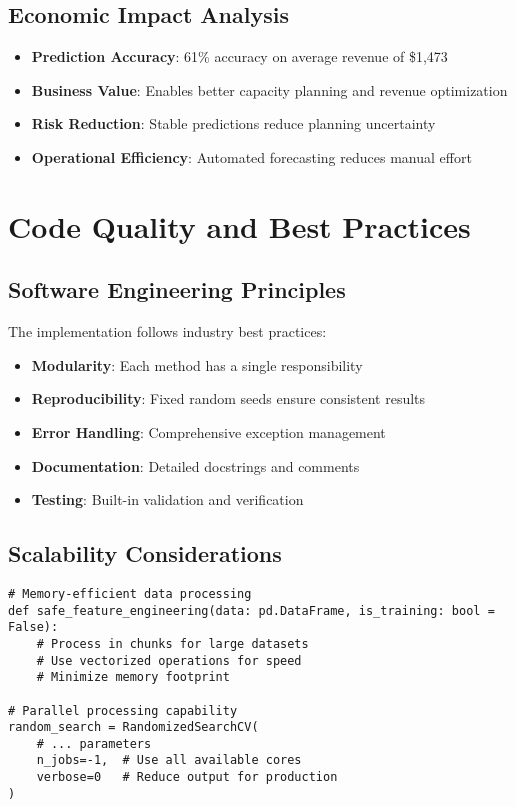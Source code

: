 \documentclass[12pt,a4paper]{article}
\begin{document}
\subsection{Economic Impact Analysis}

\begin{itemize}
    \item \textbf{Prediction Accuracy}: 61\% accuracy on average revenue of \$1,473
    \item \textbf{Business Value}: Enables better capacity planning and revenue optimization
    \item \textbf{Risk Reduction}: Stable predictions reduce planning uncertainty
    \item \textbf{Operational Efficiency}: Automated forecasting reduces manual effort
\end{itemize}

\section{Code Quality and Best Practices}

\subsection{Software Engineering Principles}

The implementation follows industry best practices:

\begin{itemize}
    \item \textbf{Modularity}: Each method has a single responsibility
    \item \textbf{Reproducibility}: Fixed random seeds ensure consistent results
    \item \textbf{Error Handling}: Comprehensive exception management
    \item \textbf{Documentation}: Detailed docstrings and comments
    \item \textbf{Testing}: Built-in validation and verification
\end{itemize}

\subsection{Scalability Considerations}

\begin{lstlisting}[caption=Scalable Design Patterns]
# Memory-efficient data processing
def safe_feature_engineering(data: pd.DataFrame, is_training: bool = False):
    # Process in chunks for large datasets
    # Use vectorized operations for speed
    # Minimize memory footprint
    
# Parallel processing capability
random_search = RandomizedSearchCV(
    # ... parameters
    n_jobs=-1,  # Use all available cores
    verbose=0   # Reduce output for production
)
\end{lstlisting}
\end{document}
